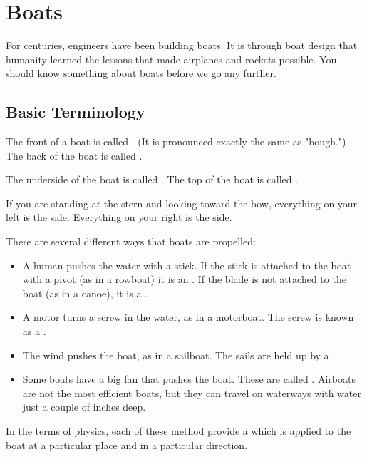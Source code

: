\chapter{Boats}

For centuries,  engineers have been building boats.  It is through boat design that humanity learned the lessons that made airplanes and rockets possible.  
You should know something about boats before we go any further.

\section{Basic Terminology}

The front of a boat is called . (It is pronounced exactly the same as "bough.")   The back of the boat is called .

The underside of the boat is called .  The top of the boat is called .

If you are standing at the stern and looking toward the bow,  everything on your left is the  side.  Everything on your right is the  side.

There are several different ways that boats are propelled:

\begin{itemize}

\item A human pushes the water with a stick.  If the stick is attached to the boat with a pivot (as in a rowboat) it is an .  If the blade is not attached to the boat (as in a canoe), it is a .

\item A motor turns a screw in the water, as in a motorboat. The screw is known as a .

\item The wind pushes the boat,  as in a sailboat.  The sails are held up by a .

\item Some boats have a big fan that pushes the boat.  These are called .   Airboats are not the most efficient boats,  but they can travel
on waterways with water just a couple of inches deep.

\end{itemize}

In the terms of physics,  each of these method provide a  which is applied to the boat at a particular place and in a particular direction.

